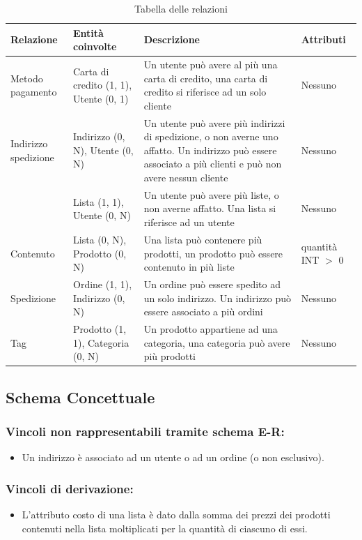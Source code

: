 \documentclass[11pt]{article}
\begin{document}
\begin{table}[H]
	\centering
	\begin{tabularx}{\textwidth}{|l|X|X|l|}
		\hline 
		\textbf{Relazione} & \textbf{Entità coinvolte} & \textbf{Descrizione} &
		\textbf{Attributi} \\
		\hline
		Metodo pagamento & Carta di credito (1, 1), Utente (0, 1) & Un utente
		può avere al più una carta di credito, una carta di credito si riferisce
		ad un solo cliente & Nessuno \\
		\hline
		Indirizzo spedizione & Indirizzo (0, N), Utente (0, N) & Un utente può
		avere più indirizzi di spedizione, o non averne uno affatto. Un
		indirizzo può essere associato a più clienti e può non avere nessun
		cliente & Nessuno \\
		\hline
		& Lista (1, 1), Utente (0, N) & Un utente può avere più liste, o non
		averne affatto. Una lista si riferisce ad un utente & Nessuno \\
		\hline
		Contenuto & Lista (0, N), Prodotto (0, N) & Una lista può contenere più
		prodotti, un prodotto può essere contenuto in più liste & quantità INT
		$>$ 0 \\
		\hline
		Spedizione & Ordine (1, 1), Indirizzo (0, N) & Un ordine può essere
		spedito ad un solo indirizzo. Un indirizzo può essere associato a più
		ordini & Nessuno \\
		\hline
		Tag & Prodotto (1, 1), Categoria (0, N) & Un prodotto appartiene ad una
		categoria, una categoria può avere più prodotti & Nessuno \\
		\hline
	\end{tabularx}
	\caption{Tabella delle relazioni}
\end{table}

\subsection{Schema Concettuale}

\subsubsection{Vincoli non rappresentabili tramite schema E-R:}
\begin{itemize}
	\item Un indirizzo è associato ad un utente o ad un ordine (o non
		esclusivo).

\end{itemize}

\subsubsection{Vincoli di derivazione:}
\begin{itemize}
	\item L'attributo costo di una lista è dato dalla somma dei prezzi dei
		prodotti contenuti nella lista moltiplicati per la quantità di ciascuno
		di essi.
\end{itemize}
\end{document}
